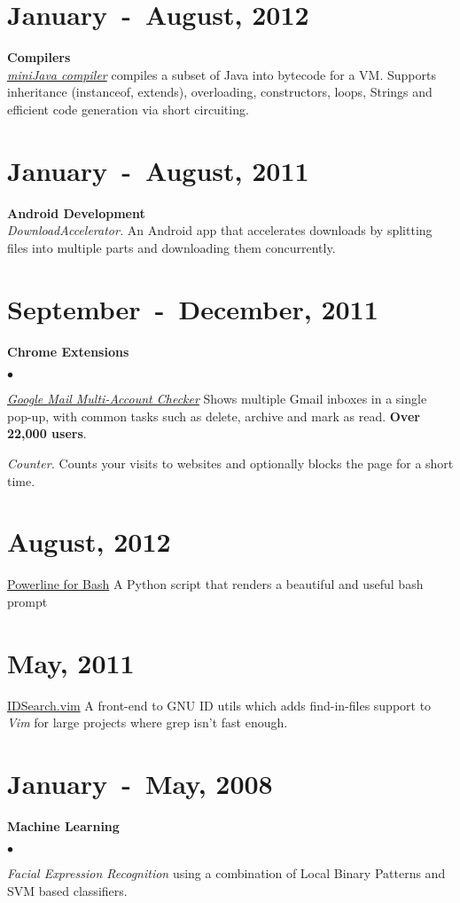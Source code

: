 \documentclass[margin,line]{res}
\newcommand{\datesection}[1]{\section{\textnormal{\scriptsize \textcolor{subtle}{#1}}}}
\newenvironment{list2}{
  \begin{list}{$\bullet$}{%
      \setlength{\itemsep}{0in}
      \setlength{\parsep}{0in} \setlength{\parskip}{0in}
      \setlength{\topsep}{0in} \setlength{\partopsep}{0in} 
      \setlength{\leftmargin}{0.2in}}}{\end{list}}
\begin{document}
\begin{resume}
\datesection{January~-~August, 2012}
{\bf Compilers}\\
{\em \href{https://github.com/milkbikis/miniJava-compiler}{miniJava compiler}} compiles a subset of Java into bytecode for a VM. Supports inheritance (instanceof, extends), overloading, constructors, loops, Strings and efficient code generation via short circuiting.

\datesection{January~-~August, 2011}
{\bf Android Development} \\
{\em DownloadAccelerator.} An Android app that accelerates downloads by splitting files into multiple parts and downloading them concurrently.

\datesection{September~-~December, 2011}
{\bf Chrome Extensions}
\begin{list2}
\item {\href{https://chrome.google.com/webstore/detail/mcpnehokodklgijkcakcfmccgpanipfp}{\em Google Mail Multi-Account Checker}} Shows multiple Gmail inboxes in a single pop-up, with common tasks such as delete, archive and mark as read. \textbf{Over 22,000 users}.
\item {\em Counter.} Counts your visits to websites and optionally blocks the page for a short time.
\end{list2}

\datesection{August, 2012}
{\href{https://github.com/milkbikis/powerline-bash}{Powerline for Bash}} A Python script that renders a beautiful and useful bash prompt
\datesection{May, 2011}
{\href{http://www.vim.org/scripts/script.php?script_id=3630}{IDSearch.vim}} A front-end to GNU ID utils which adds find-in-files support to {\em Vim} for large projects where grep isn't fast enough.

\datesection{January~-~May, 2008}
{\bf Machine Learning}
\begin{list2}
\item {\em Facial Expression Recognition} using a combination of Local Binary Patterns and SVM based classifiers.
\end{list2}


\end{resume}
\end{document}
